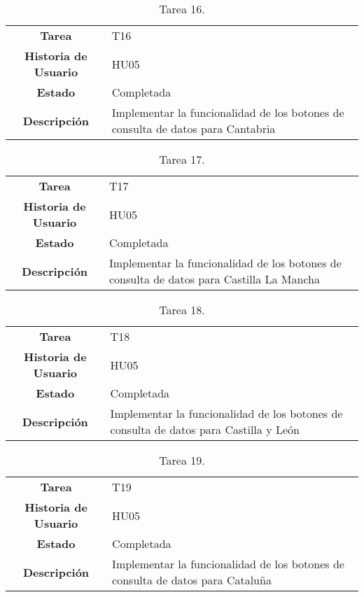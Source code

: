 \begin{table}[H]
	\begin{center}
		\begin{tabular}{| c | p{9cm} |}
			\hline
			
			\textbf{Tarea} & T16 \\
			\textbf{Historia de Usuario} & HU05 \\
			\textbf{Estado} & Completada \\
			\textbf{Descripción} & Implementar la funcionalidad de los botones de consulta de datos para Cantabria \\ \hline
		\end{tabular}
		\caption{Tarea 16.}
	\end{center}
\end{table}

\begin{table}[H]
	\begin{center}
		\begin{tabular}{| c | p{9cm} |}
			\hline
			
			\textbf{Tarea} & T17 \\
			\textbf{Historia de Usuario} & HU05 \\
			\textbf{Estado} & Completada \\
			\textbf{Descripción} & Implementar la funcionalidad de los botones de consulta de datos para Castilla La Mancha \\ \hline
		\end{tabular}
		\caption{Tarea 17.}
	\end{center}
\end{table}

\begin{table}[H]
	\begin{center}
		\begin{tabular}{| c | p{9cm} |}
			\hline
			
			\textbf{Tarea} & T18 \\
			\textbf{Historia de Usuario} & HU05 \\
			\textbf{Estado} & Completada \\
			\textbf{Descripción} & Implementar la funcionalidad de los botones de consulta de datos para Castilla y León \\ \hline
		\end{tabular}
		\caption{Tarea 18.}
	\end{center}
\end{table}

\begin{table}[H]
	\begin{center}
		\begin{tabular}{| c | p{9cm} |}
			\hline
			
			\textbf{Tarea} & T19 \\
			\textbf{Historia de Usuario} & HU05 \\
			\textbf{Estado} & Completada \\
			\textbf{Descripción} & Implementar la funcionalidad de los botones de consulta de datos para Cataluña \\ \hline
		\end{tabular}
		\caption{Tarea 19.}
	\end{center}
\end{table}

